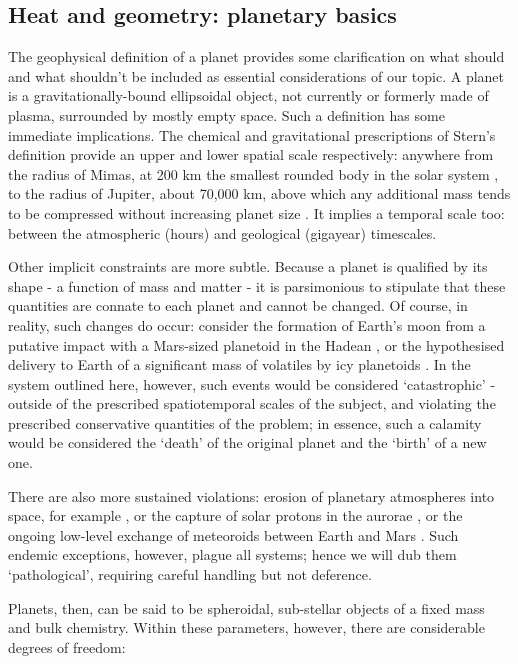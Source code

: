 \documentclass[a4paper,11pt,oneside]{book}
\begin{document}
\subsection{Heat and geometry: planetary basics}

The geophysical definition of a planet provides some clarification on what should and what shouldn't be included as essential considerations of our topic. A planet is a gravitationally-bound ellipsoidal object, not currently or formerly made of plasma, surrounded by mostly empty space. Such a definition has some immediate implications. The chemical and gravitational prescriptions of Stern's definition provide an upper and lower spatial scale respectively: anywhere from the radius of Mimas, at 200 km the smallest rounded body in the solar system \cite{Lodders1998-dj}, to the radius of Jupiter, about 70,000 km, above which any additional mass tends to be compressed without increasing planet size \cite{Basri2006-vw}. It implies a temporal scale too: between the atmospheric (hours) and geological (gigayear) timescales.

Other implicit constraints are more subtle. Because a planet is qualified by its shape - a function of mass and matter - it is parsimonious to stipulate that these quantities are connate to each planet and cannot be changed. Of course, in reality, such changes do occur: consider the formation of Earth's moon from a putative impact with a Mars-sized planetoid in the Hadean \cite{Canup2012-nz}, or the hypothesised delivery to Earth of a significant mass of volatiles by icy planetoids \cite{Owen2000-ze}. In the system outlined here, however, such events would be considered `catastrophic' - outside of the prescribed spatiotemporal scales of the subject, and violating the prescribed conservative quantities of the problem; in essence, such a calamity would be considered the `death' of the original planet and the `birth' of a new one.

There are also more sustained violations: erosion of planetary atmospheres into space, for example \citet{Perez_de_Tejada1992-qq, Kulikov2006-pc}, or the capture of solar protons in the aurorae \cite{Rees1982-vr}, or the ongoing low-level exchange of meteoroids between Earth and Mars \cite{Melosh1993-cb}. Such endemic exceptions, however, plague all systems; hence we will dub them `pathological', requiring careful handling but not deference.

Planets, then, can be said to be spheroidal, sub-stellar objects of a fixed mass and bulk chemistry. Within these parameters, however, there are considerable degrees of freedom:
\end{document}
